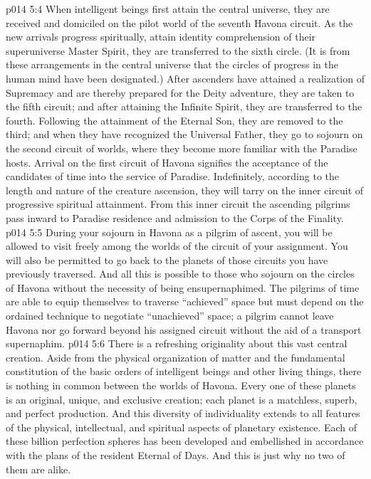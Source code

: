 \vs p014 5:4 \pc When intelligent beings first attain the central universe, they are received and domiciled on the pilot world of the seventh Havona circuit. As the new arrivals progress spiritually, attain identity comprehension of their superuniverse Master Spirit, they are transferred to the sixth circle. (It is from these arrangements in the central universe that the circles of progress in the human mind have been designated.) After ascenders have attained a realization of Supremacy and are thereby prepared for the Deity adventure, they are taken to the fifth circuit; and after attaining the Infinite Spirit, they are transferred to the fourth. Following the attainment of the Eternal Son, they are removed to the third; and when they have recognized the Universal Father, they go to sojourn on the second circuit of worlds, where they become more familiar with the Paradise hosts. Arrival on the first circuit of Havona signifies the acceptance of the candidates of time into the service of Paradise. Indefinitely, according to the length and nature of the creature ascension, they will tarry on the inner circuit of progressive spiritual attainment. From this inner circuit the ascending pilgrims pass inward to Paradise residence and admission to the Corps of the Finality.
\vs p014 5:5 During your sojourn in Havona as a pilgrim of ascent, you will be allowed to visit freely among the worlds of the circuit of your assignment. You will also be permitted to go back to the planets of those circuits you have previously traversed. And all this is possible to those who sojourn on the circles of Havona without the necessity of being ensupernaphimed. The pilgrims of time are able to equip themselves to traverse “achieved” space but must depend on the ordained technique to negotiate “unachieved” space; a pilgrim cannot leave Havona nor go forward beyond his assigned circuit without the aid of a transport supernaphim.
\vs p014 5:6 \pc There is a refreshing originality about this vast central creation. Aside from the physical organization of matter and the fundamental constitution of the basic orders of intelligent beings and other living things, there is nothing in common between the worlds of Havona. Every one of these planets is an original, unique, and exclusive creation; each planet is a matchless, superb, and perfect production. And this diversity of individuality extends to all features of the physical, intellectual, and spiritual aspects of planetary existence. Each of these billion perfection spheres has been developed and embellished in accordance with the plans of the resident Eternal of Days. And this is just why no two of them are alike.

